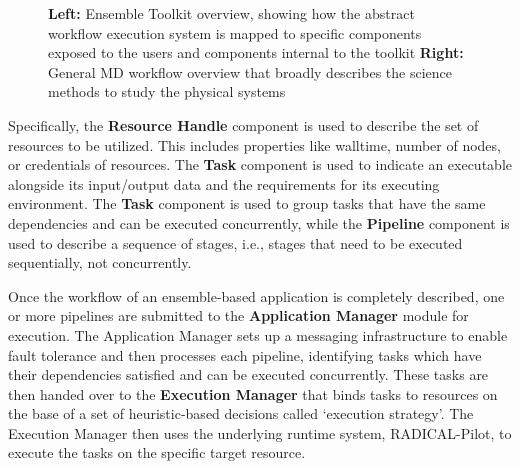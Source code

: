 \begin{figure}[!htbp]
  \centering
  \begin{minipage}[b]{0.55\textwidth}
  \centering
  \end{minipage}
  \begin{minipage}[b]{0.44\textwidth}
  \centering
  \end{minipage}
  \caption{\textbf{Left:} Ensemble Toolkit overview, showing how the abstract
  workflow execution system is mapped to specific components exposed to the
  users and components internal to the toolkit \textbf{Right:} General MD
  workflow overview that broadly describes the science methods to study the
  physical systems}\label{fig:entk_arch}
\end{figure}

Specifically, the \textbf{Resource Handle} component is used to describe the
set of resources to be utilized. This includes properties like walltime,
number of nodes, or credentials of resources. The \textbf{Task} component is
used to indicate an executable alongside its input/output data and the
requirements for its executing environment. The \textbf{Task} component is
used to group tasks  that have the same dependencies and can be executed
concurrently, while the \textbf{Pipeline} component is used to describe a
sequence of stages, i.e., stages that need to be executed sequentially, not
concurrently.

Once the workflow of an ensemble-based application is completely described,
one or more pipelines are submitted to the \textbf{Application Manager}
module for execution. The Application Manager sets up a messaging
infrastructure to enable fault tolerance and then processes each pipeline,
identifying tasks which have their dependencies satisfied and can be executed
concurrently. These tasks are then handed over to the \textbf{Execution
Manager} that binds tasks to resources on the base of a set of
heuristic-based decisions called `execution strategy'. The Execution Manager
then uses the underlying runtime system, RADICAL-Pilot, to execute the tasks
on the specific target resource.

